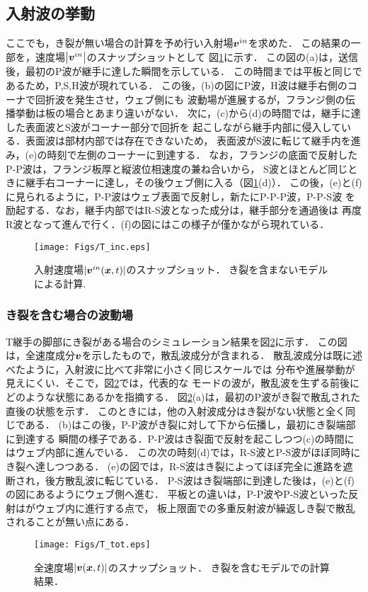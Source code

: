 \subsection{入射波の挙動}
ここでも，き裂が無い場合の計算を予め行い入射場$\mbox{\boldmath $v$}^{in}$を求めた．
この結果の一部を，速度場$\left| \mbox{\boldmath $v$}^{in}\right|$のスナップショットとして
図\ref{fig:fig3_5}に示す．
この図の(a)は，送信後，最初のP波が継手に達した瞬間を示している．
この時間までは平板と同じであるため，P,S,H波が現れている．
この後，(b)の図にP波，H波は継手右側のコーナで回折波を発生させ，ウェブ側にも
波動場が進展するが，フランジ側の伝播挙動は板の場合とあまり違いがない．
次に，(c)から(d)の時間では，継手に達した表面波とS波がコーナー部分で回折を
起こしながら継手内部に侵入している．表面波は部材内部では存在できないため，
表面波がS波に転じて継手内を進み，(e)の時刻で左側のコーナーに到達する．
なお，フランジの底面で反射したP-P波は，フランジ板厚と縦波位相速度の兼ね合いから，
S波とほとんど同じときに継手右コーナーに達し，その後ウェブ側に入る（図\ref{fig:fig3_5}(d)）．
この後，(e)と(f)に見られるように，P-P波はウェブ表面で反射し，新たにP-P-P波，P-P-S波
を励起する．なお，継手内部ではR-S波となった成分は，継手部分を通過後は
再度R波となって進んで行く．(f)の図にはこの様子が僅かながら現れている．
\begin{figure}[h]
	\begin{center}
	\texttt{[image: Figs/T\_inc.eps]} 
	\end{center}
	\caption{
		入射速度場$|\mbox{\boldmath $v$}^{in}(\mbox{\boldmath $x$},t)|$のスナップショット．
		き裂を含まないモデルによる計算.
	} 
	\label{fig:fig3_5}
\end{figure}
\subsubsection{き裂を含む場合の波動場}
T継手の脚部にき裂がある場合のシミュレーション結果を図\ref{fig:fig3_6}に示す．
この図は，全速度成分$\mbox{\boldmath $v$}$を示したもので，散乱波成分が含まれる．
散乱波成分は既に述べたように，入射波に比べて非常に小さく同じスケールでは
分布や進展挙動が見えにくい．そこで，図\ref{fig:fig3_6}では，代表的な
モードの波が，散乱波を生ずる前後にどのような状態にあるかを指摘する．
図\ref{fig:fig3_6}(a)は，最初のP波がき裂で散乱された直後の状態を示す．
このときには，他の入射波成分はき裂がない状態と全く同じである．
(b)はこの後，P-P波がき裂に対して下から伝播し，最初にき裂端部に到達する
瞬間の様子である．P-P波はき裂面で反射を起こしつつ(c)の時間にはウェブ内部に進んでいる．
この次の時刻(d)では，R-S波とP-S波がほぼ同時にき裂へ達しつつある．
(e)の図では，R-S波はき裂によってほぼ完全に進路を遮断され，後方散乱波に転じている．
P-S波はき裂端部に到達した後は，(e)と(f)の図にあるようにウェブ側へ進む．
平板との違いは，P-P波やP-S波といった反射はがウェブ内に進行する点で，
板上限面での多重反射波が繰返しき裂で散乱されることが無い点にある．
\begin{figure}[h]
	\begin{center}
	\texttt{[image: Figs/T\_tot.eps]} 
	\end{center}
	\caption{
		全速度場$|\mbox{\boldmath $v$}(\mbox{\boldmath $x$},t)|$のスナップショット．
		き裂を含むモデルでの計算結果．
	} 
	\label{fig:fig3_6}
\end{figure}
